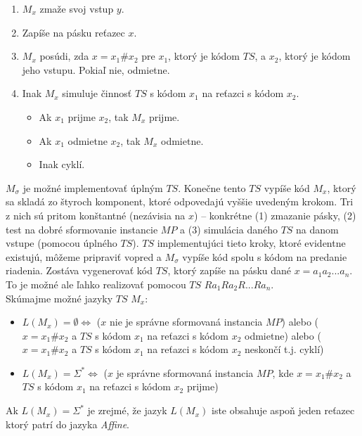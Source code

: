 \documentclass[11pt,a4paper]{article}
\begin{document}
\begin{enumerate}
    \item $M_{x}$ zmaže svoj vstup $y$.
    \item Zapíše na pásku reťazec $x$.
    \item $M_{x}$ posúdi, zda $x=x_{1}\#x_{2}$ pre $x_1$, ktorý je kódom $TS$, a $x_2$, ktorý je kódom jeho vstupu. Pokiaľ nie, odmietne.
    \item Inak $M_{x}$ simuluje činnosť $TS$ s kódom $x_1$ na reťazci s kódom $x_2$.
        \begin{itemize}
            \item Ak $x_1$ prijme $x_2$, tak $M_x$ prijme.
            \item Ak $x_1$ odmietne $x_2$, tak $M_x$ odmietne.
            \item Inak cyklí.
        \end{itemize}
\end{enumerate}

$M_{\sigma}$ je možné implementovať úplným $TS$. Konečne tento $TS$ vypíše kód $M_x$, ktorý sa skladá zo štyroch komponent, ktoré odpovedajú vyššie uvedeným krokom. Tri z nich sú pritom konštantné (nezávisia na $x$) -- konkrétne (1) zmazanie pásky, (2) test na dobré sformovanie instancie $MP$ a (3) simulácia daného $TS$ na danom vstupe (pomocou úplného $TS$). $TS$ implementujúci tieto kroky, ktoré evidentne existujú, môžeme pripraviť vopred a $M_{\sigma}$ vypíše kód spolu s kódom na predanie riadenia. Zostáva vygenerovať kód $TS$, ktorý zapíše na pásku dané $x = a_1a_2...a_n$. To je možné ale ľahko realizovať pomocou $TS$ $Ra_1Ra_2R...Ra_n$. \\

Skúmajme možné jazyky $TS$ $M_x$:

\begin{itemize}
    \item $L(M_x) = \emptyset \Longleftrightarrow $ ($x$ nie je správne sformovaná instancia $MP$) alebo ($x=x_1\#x_2$ a $TS$ s kódom $x_1$ na reťazci s kódom $x_2$ odmietne) alebo ($x=x_1\#x_2$ a $TS$ s kódom $x_1$ na reťazci s kódom $x_2$ neskončí t.j. cyklí)
    \item $L(M_x) = \Sigma^* \Longleftrightarrow $ ($x$ je správne sformovaná instancia $MP$, kde $x=x_1\#x_2$ a $TS$ s kódom $x_1$ na reťazci s kódom $x_2$ prijme)
\end{itemize}

Ak $L(M_x) = \Sigma^*$ je zrejmé, že jazyk $L(M_x)$ iste obsahuje aspoň jeden reťazec ktorý patrí do jazyka \textit{Affine}.\\
\end{document}
